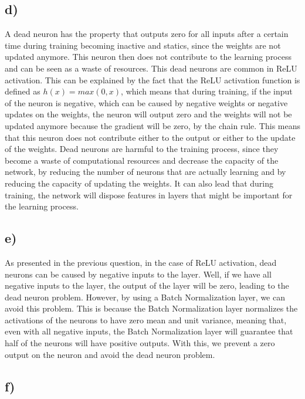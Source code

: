 \documentclass{article}
\begin{document}
\subsection*{d)}

A dead neuron has the property that outputs zero for all inputs after a certain time during training
becoming inactive and statics, since the weights are not updated anymore. This neuron then does not contribute
to the learning process and can be seen as a waste of resources. This dead neurons are common in ReLU activation. 
This can be explained by the fact that the ReLU activation function is defined as $h(x) = max(0, x)$, which means that
during training, if the input of the neuron is negative, which can be caused by negative weights or
negative updates on the weights, the neuron will output zero and the weights will not be updated anymore because
the gradient will be zero, by the chain rule. This means that this neuron does not contribute either to the output
or either to the update of the weights.
Dead neurons are harmful to the training process, since they become a waste of computational resources and decrease
the capacity of the network, by reducing the number of neurons that are actually learning and by reducing the capacity
of updating the weights. It can also lead that during training, the network will dispose features in layers
that might be important for the learning process.

\subsection*{e)}

As presented in the previous question, in the case of ReLU activation, dead neurons can be caused by negative inputs to
the layer. Well, if we have all negative inputs to the layer, the output of the layer will be zero, leading
to the dead neuron problem. However, by using a Batch Normalization layer, we can avoid this problem. This is because
the Batch Normalization layer normalizes the activations of the neurons to have zero mean and unit variance, meaning
that, even with all negative inputs, the Batch Normalization layer will guarantee that half of the neurons will have
positive outputs. With this, we prevent a zero output on the neuron and avoid the dead neuron problem.

\newpage
\subsection*{f)}
\end{document}
